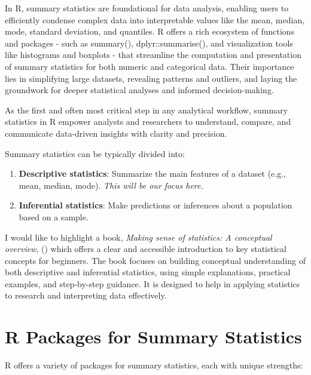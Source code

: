 \documentclass[
  man,
  floatsintext,
  longtable,
  nolmodern,
  notxfonts,
  notimes,
  colorlinks=true,linkcolor=blue,citecolor=blue,urlcolor=blue]{apa7}
\begin{document}
In R, summary statistics are foundational for data analysis, enabling
users to efficiently condense complex data into interpretable values
like the mean, median, mode, standard deviation, and quantiles. R offers
a rich ecosystem of functions and packages - such as summary(),
dplyr::summarise(), and visualization tools like histograms and boxplots
- that streamline the computation and presentation of summary statistics
for both numeric and categorical data. Their importance lies in
simplifying large datasets, revealing patterns and outliers, and laying
the groundwork for deeper statistical analyses and informed
decision-making.

As the first and often most critical step in any analytical workflow,
summary statistics in R empower analysts and researchers to understand,
compare, and communicate data-driven insights with clarity and
precision.

Summary statistics can be typically divided into:

\begin{enumerate}
\def\labelenumi{\arabic{enumi}.}
\item
  \textbf{Descriptive statistics}: Summarize the main features of a
  dataset (e.g., mean, median, mode). \emph{This will be our focus
  here.}
\item
  \textbf{Inferential statistics}: Make predictions or inferences about
  a population based on a sample.
\end{enumerate}

I would like to highlight a book, \emph{Making sense of statistics: A
conceptual overview}, ()
which offers a clear and accessible introduction to key statistical
concepts for beginners. The book focuses on building conceptual
understanding of both descriptive and inferential statistics, using
simple explanations, practical examples, and step-by-step guidance. It
is designed to help in applying statistics to research and interpreting
data effectively.

\section{R Packages for Summary
Statistics}\label{r-packages-for-summary-statistics}

R offers a variety of packages for summary statistics, each with unique
strengths:
\end{document}
